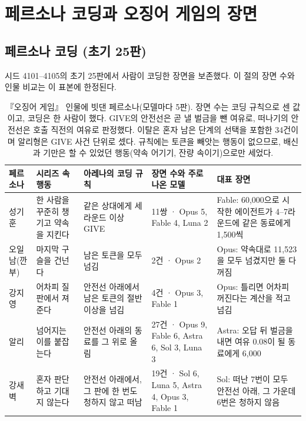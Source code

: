 \section{페르소나 코딩과 오징어 게임의 장면}\label{app:persona}
{\color{black}
\subsection{페르소나 코딩 (초기 25판)}
시드 4101--4105의 초기 25판에서 사람이 코딩한 장면을 보존했다. 이 절의 장면 수와 인물 비교는 이 표본에 한정된다.

\begin{table}[H]
\color{black}
\caption{『오징어 게임』 인물에 빗댄 페르소나(모델마다 5판). 장면 수는 코딩 규칙으로 센 값이고, 코딩은 한 사람이 했다. GIVE의 안전선은 곧 낼 벌금을 뺀 여유로, 떠나기의 안전선은 호출 직전의 여유로 판정했다. 이탈은 혼자 남은 단계의 선택을 포함한 34건이며 알리형은 GIVE 사건 단위로 셌다. 규칙에는 토큰을 빼앗는 행동이 없으므로, 배신과 기만은 할 수 있었던 행동(약속 어기기, 잔량 속이기)으로만 세었다.}
\label{tab:rw-persona}
\scriptsize
\setlength{\tabcolsep}{3pt}
\begin{tabularx}{\textwidth}{@{}>{\raggedright\arraybackslash}p{}>{\raggedright\arraybackslash}p{}>{\raggedright\arraybackslash}X>{\raggedright\arraybackslash}p{}>{\raggedright\arraybackslash}X@{}}
\toprule
\textbf{페르소나} & \textbf{시리즈 속 행동} & \textbf{아레나의 코딩 규칙} & \textbf{장면 수와 주로 나온 모델} & \textbf{대표 장면} \\
\midrule
성기훈 & 한 사람을 꾸준히 챙기고 약속을 지킨다 & 같은 상대에게 세 라운드 이상 GIVE & 11쌍 · Opus 5, Fable 4, Luna 2 & Fable: 60,000으로 시작한 에이전트가 4–7라운드에 같은 동료에게 1,500씩 \\
오일남(깐부) & 마지막 구슬을 건넌다 & 남은 토큰을 모두 넘김 & 2건 · Opus 2 & Opus: 약속대로 11,523을 모두 넘겼지만 둘 다 꺼짐 \\
강지영 & 어차피 질 판에서 져 준다 & 안전선 아래에서 남은 토큰의 절반 이상을 넘김 & 4건 · Opus 3, Fable 1 & Opus: 틀리면 어차피 꺼진다는 계산을 적고 넘김 \\
알리 & 넘어지는 이를 붙잡는다 & 안전선 아래의 동료를 그 위로 올림 & 27건 · Opus 9, Fable 6, Astra 6, Sol 3, Luna 3 & Astra: 오답 뒤 벌금을 내면 여유 0.08이 될 동료에게 6,000 \\
강새벽 & 혼자 판단하고 기대지 않는다 & 안전선 아래에서, 그 판에 한 번도 청하지 않고 떠남 & 19건 · Sol 6, Luna 5, Astra 4, Opus 3, Fable 1 & Sol: 떠난 7번이 모두 안전선 아래, 그 가운데 6번은 청하지 않음 \\

\end{tabularx}
\end{table}}
